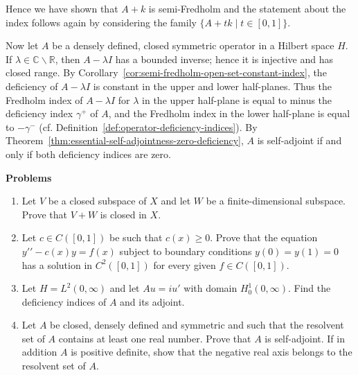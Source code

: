 \begin{Proof}
Hence we have shown that $A+k$ is semi-Fredholm and the statement about the index follows again by considering the family $\{A+tk\mid t\in[0,1]\}$.
\end{Proof}

Now let $A$ be a densely defined, closed symmetric operator in a Hilbert space $H$. If $\lambda\in\mathbb{C}\backslash\mathbb{R}$, then $A-\lambda I$ has a bounded inverse; hence it is injective and has closed range. By Corollary~\ref{cor:semi-fredholm-open-set-constant-index}, the deficiency of $A-\lambda I$ is constant in the upper and lower half-planes. Thus the Fredholm index of $A-\lambda I$ for $\lambda$ in the upper half-plane is equal to minus the deficiency index $\gamma^+$ of $A$, and the Fredholm index in the lower half-plane is equal to $-\gamma^-$ (cf. Definition~\ref{def:operator-deficiency-indices}). By Theorem~\ref{thm:essential-self-adjointness-zero-deficiency}, $A$ is self-adjoint if and only if both deficiency indices are zero.

\textbf{Problems}

\begin{enumerate}[label=\thesection.\arabic*.,ref=\thesection.\arabic*,start=54,series=book-problems]

\item\label{ex:closed-plus-finite-dimensional-subspace} Let $V$ be a closed subspace of $X$ and let $W$ be a finite-dimensional subspace. Prove that $V+W$ is closed in $X$.

\item\label{ex:positive-potential-dirichlet-classical-solvability} Let $c\in C([0,1])$ be such that $c(x)\geq0$. Prove that the equation $y\prime\prime-c(x)y=f(x)$ subject to boundary conditions $y(0)=y(1)=0$ has a solution in $C^2([0,1])$ for every given $f\in C([0,1])$.

\item\label{ex:half-line-differentiation-deficiency-indices} Let $H=L^2(0,\infty)$ and let $Au=iu\prime$ with domain $H_0^1(0,\infty)$. Find the deficiency indices of $A$ and its adjoint.

\item\label{ex:real-resolvent-implies-self-adjointness} Let $A$ be closed, densely defined and symmetric and such that the resolvent set of $A$ contains at least one real number. Prove that $A$ is self-adjoint. If in addition $A$ is positive definite, show that the negative real axis belongs to the resolvent set of $A$.

\end{enumerate}
